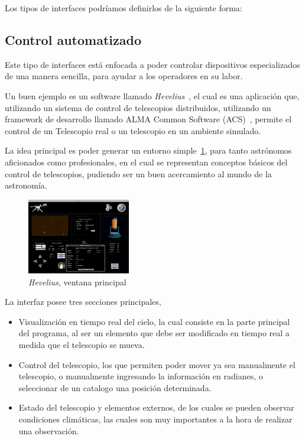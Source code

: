 Los tipos de interfaces podríamos definirlos de la siguiente forma:

\subsection{Control automatizado}

Este tipo de interfaces está enfocada a poder controlar dispositivos
especializados de una manera sencilla, para ayudar a los operadores
en su labor.

Un buen ejemplo es un software llamado \emph{Hevelius}~\cite{hevelius},
el cual es una aplicación que, utilizando un sistema de control
de telescopios distribuidos, utilizando un framework de desarrollo
llamado ALMA Common Software (ACS)~\cite{acs},
permite el control de un Telescopio real o un telescopio en un ambiente
simulado.

La idea principal es poder generar un entorno simple~\ref{fig:hevelius},
para tanto astrónomos aficionados como profesionales,
en el cual se representan conceptos básicos del control de telescopios,
pudiendo ser un buen acercamiento al mundo de la astronomía.

\begin{figure}[!htb]
\begin{center}
    \includegraphics[width=0.4\textwidth]{img/hevelius}
    \caption{\emph{Hevelius}, ventana principal}
    \label{fig:hevelius}
\end{center}
\end{figure}

La interfaz posee tres secciones principales,

\begin{itemize}
    \item Visualización en tiempo real del cielo, la cual
        consiste en la parte principal  del programa,
        al ser un elemento que debe ser modificado en tiempo real
        a medida que el telescopio se mueva.
    \item Control del telescopio, los que permiten poder
        mover ya sea manualmente el telescopio, o manualmente
        ingresando la información en radianes, o seleccionar
        de un catalogo una posición determinada.
    \item Estado del telescopio y elementos externos,
        de los cuales se pueden observar condiciones climáticas,
        las cuales son muy importantes a la hora de realizar
        una observación.
\end{itemize}

